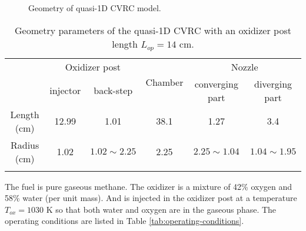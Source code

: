 \begin{figure}
\centering
{}
\caption{Geometry of quasi-1D CVRC model.}
\label{fig:radius}
\end{figure}

\begin{table} [h]
	\centering
	\caption{Geometry parameters of the quasi-1D CVRC with an oxidizer post length $L_{op}=14$ cm.}
	\centering
	\begin{tabular}{c c c c c c }
		\toprule
		\centering
		\multirow{2}{*}{Section} &
		\multicolumn{2}{c}{Oxidizer post} &
		\multirow{2}{*}{Chamber} &
		\multicolumn{2}{c}{Nozzle} \\
		\cmidrule(lr){2-3} \cmidrule(lr){5-6}
		& injector & back-step & & converging part & diverging part\\
		\midrule
		Length (cm) & 12.99 & 1.01 & 38.1 & 1.27 & 3.4 \\
		Radius (cm) & 1.02  & $1.02 \sim 2.25$ & 2.25 & $2.25 \sim 1.04$ & $1.04 \sim 1.95$ \\
		\bottomrule
		\label{tab:geometry_parameters}
	\end{tabular} 
\end{table}
The fuel is pure gaseous methane. The oxidizer is a mixture of 42\% oxygen and 58\% water (per unit mass). And is injected in the oxidizer post at a temperature $T_{ox}=1030$ K so that both water and oxygen are in the gaseous phase. The operating conditions are listed in Table \ref{tab:operating-conditions}.

